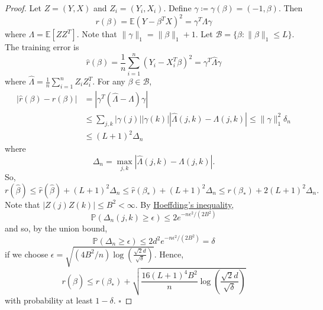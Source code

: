   \begin{proof}
    Let $Z = (Y, X)$ and $Z_i = (Y_i, X_i)$. Define $\gamma \coloneqq \gamma(\beta) = (-1, \beta)$. Then
    \begin{equation}
      r(\beta) = \mathbb{E}(Y - \beta^T X)^2 = \gamma^T \Lambda \gamma
    \end{equation}
    where $\Lambda = \mathbb{E}[ZZ^T]$. Note that $\|\gamma\|_1 = \|\beta\|_1 + 1$. Let $\mathcal{B} = \{\beta : \|\beta\|_1 \leq L\}$. The training error is
    \begin{equation}
      \hat{r}(\beta) = \frac{1}{n} \sum_{i=1}^n (Y_i - X_i^T \beta)^2 = \gamma^T \hat{\Lambda} \gamma
    \end{equation}
    where $\hat{\Lambda} = \frac{1}{n} \sum_{i=1}^n Z_i Z_i^T$. For any $\beta \in \mathcal{B}$,
    \begin{align}
      |\hat{r}(\beta) - r(\beta)| &= |\gamma^T (\hat{\Lambda} - \Lambda) \gamma| \\
      &\leq \sum_{j,k} |\gamma(j)| |\gamma(k)| |\hat{\Lambda}(j,k) - \Lambda(j,k)| \leq \|\gamma\|_1^2 \delta_n \\
      &\leq (L + 1)^2 \Delta_n
    \end{align}
    where
    \begin{equation}
      \Delta_n = \max_{j,k} |\hat{\Lambda}(j,k) - \Lambda(j,k)|.
    \end{equation}
    So,
    \begin{equation}
      r(\hat{\beta}) \leq \hat{r}(\hat{\beta}) + (L + 1)^2 \Delta_n \leq \hat{r}(\beta_*) + (L + 1)^2 \Delta_n \leq r(\beta_*) + 2(L + 1)^2 \Delta_n.
    \end{equation}
    Note that $|Z(j)Z(k)| \leq B^2 < \infty$. By \hyperref[prob-thm:hoeffdings-inequality]{Hoeffding's inequality},
    \begin{equation}
      \mathbb{P}(\Delta_n(j,k) \geq \epsilon) \leq 2e^{-n\epsilon^2/(2B^2)}
    \end{equation}
    and so, by the union bound,
    \begin{equation}
      \mathbb{P}(\Delta_n \geq \epsilon) \leq 2d^2 e^{-n\epsilon^2/(2B^2)} = \delta
    \end{equation}
    if we choose $\epsilon = \sqrt{(4B^2/n) \log \left( \frac{\sqrt{2}d}{\sqrt{\delta}} \right)}$. Hence,
    \begin{equation}
      r(\hat{\beta}) \leq r(\beta_*) + \sqrt{\frac{16(L + 1)^4 B^2}{n} \log \left( \frac{\sqrt{2}d}{\sqrt{\delta}} \right)}
    \end{equation}
    with probability at least $1 - \delta$. $\square$
  \end{proof}

